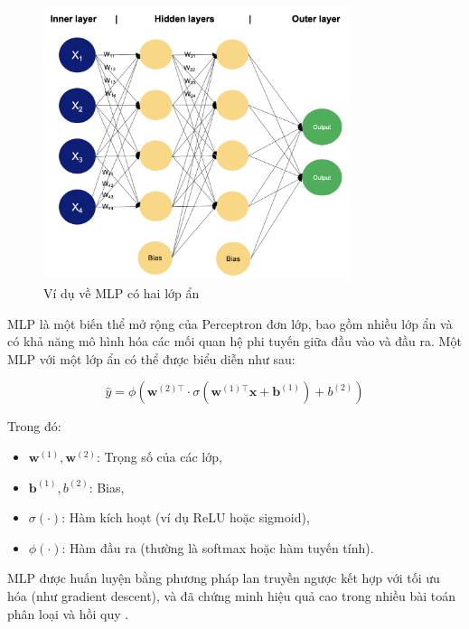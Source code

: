 \begin{figure}[h]
    \centering
    \includegraphics[width=0.8\textwidth]{image/section3_4/mlp.png}
    \caption{Ví dụ về MLP có hai lớp ẩn}
    \label{fig:section3_4__1}
\end{figure}


MLP là một biến thể mở rộng của Perceptron đơn lớp, bao gồm nhiều lớp ẩn và có khả năng mô hình hóa các mối quan hệ phi tuyến giữa đầu vào và đầu ra. Một MLP với một lớp ẩn có thể được biểu diễn như sau:

\[
\hat{y} = \phi(\mathbf{w}^{(2)\top} \cdot \sigma(\mathbf{w}^{(1)\top} \mathbf{x} + \mathbf{b}^{(1)}) + b^{(2)})
\]

Trong đó:
\begin{itemize}
    \item \(\mathbf{w}^{(1)}, \mathbf{w}^{(2)}\): Trọng số của các lớp,
    \item \(\mathbf{b}^{(1)}, b^{(2)}\): Bias,
    \item \(\sigma(\cdot)\): Hàm kích hoạt (ví dụ ReLU hoặc sigmoid),
    \item \(\phi(\cdot)\): Hàm đầu ra (thường là softmax hoặc hàm tuyến tính).
\end{itemize}

MLP được huấn luyện bằng phương pháp lan truyền ngược kết hợp với tối ưu hóa (như gradient descent), và đã chứng minh hiệu quả cao trong nhiều bài toán phân loại và hồi quy \cite{bishop1995neural}.
